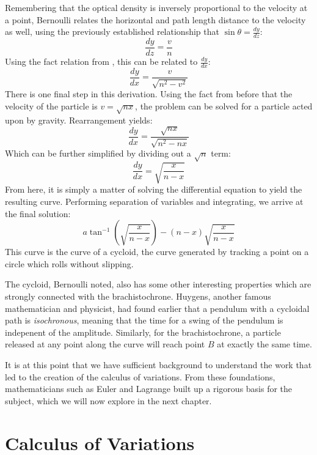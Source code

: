 Remembering that the optical density is inversely proportional to the velocity at a point, Bernoulli relates the horizontal and path length distance to the velocity as well, using the previously established relationship that $\sin\theta=\frac{dy}{dz}$:
$$\frac{dy}{dz}=\frac{v}{n}$$
Using the fact relation from , this can be related to $\frac{dy}{dx}$:
$$\frac{dy}{dx}=\frac{v}{\sqrt{n^2-v^2}}$$
There is one final step in this derivation. Using the fact from before that the velocity of the particle is $v=\sqrt{nx}$, the problem can be solved for a particle acted upon by gravity. Rearrangement yields:
\begin{equation}
\frac{dy}{dx}=\frac{\sqrt{nx}}{\sqrt{n^2-nx}}
\end{equation}
Which can be further simplified by dividing out a $\sqrt{n}$ term:
\begin{equation}
        \frac{dy}{dx}=\sqrt{\frac{x}{n-x}}
\end{equation}
From here, it is simply a matter of solving the differential equation to yield the resulting curve. Performing separation of variables and integrating, we arrive at the final solution:
$$a\tan^{-1}\left(\sqrt{\frac{x}{n-x}}\right)-(n-x)\sqrt{\frac{x}{n-x}}$$
This curve is the curve of a cycloid, the curve generated by tracking a point on a circle which rolls without slipping.

The cycloid, Bernoulli noted, also has some other interesting properties which are strongly connected with the \gls{brachistochrone}. Huygens, another famous mathematician and physicist, had found earlier that a pendulum with a cycloidal path is \textit{isochronous}, meaning that the time for a swing of the pendulum is indepenent of the amplitude. Similarly, for the \gls{brachistochrone}, a particle released at any point along the curve will reach point $B$ at exactly the same time.


It is at this point that we have sufficient background to understand the work that led to the creation of the calculus of variations. From these foundations, mathematicians such as Euler and Lagrange built up a rigorous basis for the subject, which we will now explore in the next chapter.

\newpage

\printendnotes

\chapter{Calculus of Variations}\label{chap:calculus of variations}

